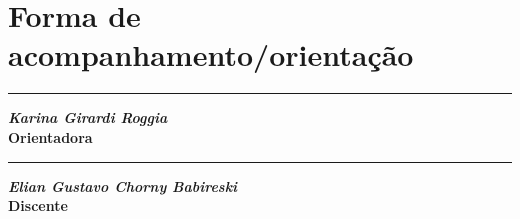 \documentclass[11pt]{article}
\begin{document}

\section{Forma de acompanhamento/orientação}







\vskip 1.5cm


\begin{minipage} {0.47\linewidth}
  \centering
  \rule{7.2cm}{0.1mm}
  \textbf{\textit{Karina Girardi Roggia}\\Orientadora}
\end{minipage}
%
\begin{minipage} {0.47\linewidth}
  \centering
  \rule{7.2cm}{0.1mm}
  \textbf{\textit{Elian Gustavo Chorny Babireski}\\Discente}
\end{minipage}
\end{document}
